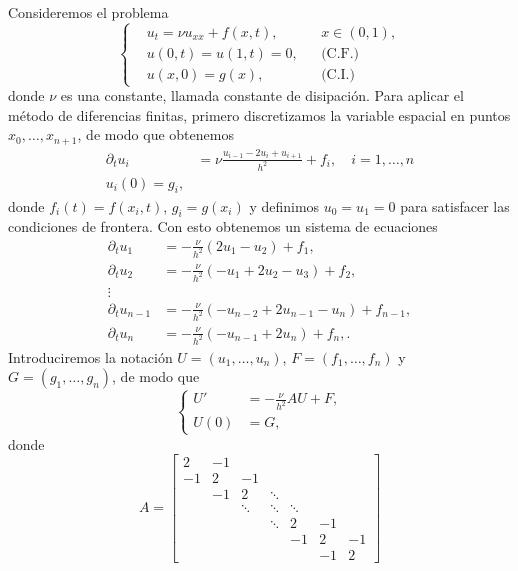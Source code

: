 \documentclass[11pt,letterpaper]{report}
\begin{document}
Consideremos el problema
\begin{equation}
  \left\{
    \begin{aligned}
      & u_t = \nu u_{xx} + f(x,t), && x\in (0,1),
      \\
      & u(0,t) = u(1,t) = 0, && \text{(C.F.)}
      \\
      & u(x,0) = g(x), && \text{(C.I.)}
    \end{aligned}
  \right.
\end{equation}
donde $\nu$ es una constante, llamada constante de disipación.
Para aplicar el método de diferencias finitas, primero discretizamos
la variable espacial en puntos $x_0,\dots,x_{n+1}$, de modo
que obtenemos
\begin{align}
  \partial_t u_{i}
    &= \nu \frac{u_{i-1} -2u_{i} + u_{i+1}}{h^{2}} + f_i,
    \quad i=1,\dots,n
  \\
    u_i(0) = g_i
,\end{align}
donde $f_i(t)=f(x_i,t)$, $g_i=g(x_i)$ y definimos $u_0=u_1=0$ para
satisfacer las condiciones de frontera.
Con esto obtenemos un sistema de ecuaciones
\begin{align}
    \partial_t u_{1}
    &= -\frac{\nu }{h^{2}}(2u_{1} - u_{2}) + f_1,
  \\
    \partial_t u_{2}
    &= -\frac{\nu }{h^{2}}(-u_{1} +2u_{2} - u_{3}) + f_2,
  \\
    \vdots
  \\
    \partial_t u_{n-1}
    &= -\frac{\nu }{h^{2}}(-u_{n-2} +2u_{n-1} - u_{n}) + f_{n-1},
  \\
    \partial_t u_{n}
    &= -\frac{\nu }{h^{2}}(-u_{n-1} +2u_{n}) + f_n,
.\end{align}
Introduciremos la notación $U=(u_1,\dots,u_n)$, $F=(f_1,\dots,f_n)$ y
$G=(g_1,\dots,g_n)$, de modo que
\begin{equation}
  \left\{
    \begin{aligned}
      U' &= -\frac{\nu}{h^{2}}AU + F,
      \\
      U(0) &= G,
    \end{aligned}
  \right.
\end{equation}
donde
\begin{equation}
  A
  =
  \begin{bmatrix}
    2 & -1 \\
    -1 & 2 & -1 \\[-1mm]
       & -1 & 2 & \ddots \\[-1mm]
       & & \ddots & \ddots & \ddots \\[-1mm]
       & & & \ddots & 2 & -1 \\
       & & & & -1 & 2 & -1 \\
       & & & & & -1 & 2
  \end{bmatrix}
\end{equation}
\end{document}

